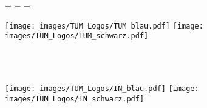 \begin{titlepage}
	\oddsidemargin=\evensidemargin\relax
	\textwidth=\dimexpr{}\evensidemargin-2in\relax
	\hsize=\textwidth\relax
	
	\centering
	
	\ifx \monochromeCover \undefined
		\texttt{[image: images/TUM\_Logos/TUM\_blau.pdf]}%
	\else
		\texttt{[image: images/TUM\_Logos/TUM\_schwarz.pdf]}%
	\fi
	
	\vspace*{20mm}
	
	\vspace{5mm}
	{\huge\MakeUppercase{\faculty}}\\
	
	\vspace{5mm}
	{\large\MakeUppercase{\uni}}\\
	
	\vspace{20mm}
	{\Large \worktype}
	
	\vspace{15mm}
	{\huge\bfseries \titleFirstLanguage}
	
	\vspace{15mm}
	{\LARGE \authorname}

	\vspace*{20mm}

	\ifx \monochromeCover \undefined
		\texttt{[image: images/TUM\_Logos/IN\_blau.pdf]}%
	\else
		\texttt{[image: images/TUM\_Logos/IN\_schwarz.pdf]}%
	\fi
	{}
\end{titlepage}